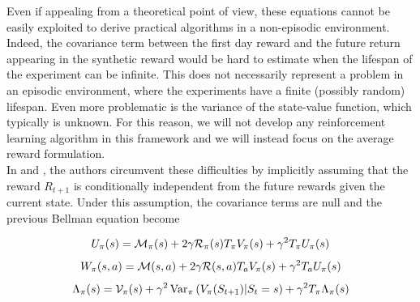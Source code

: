 Even if appealing from a theoretical point of view, these equations cannot be easily exploited to derive practical algorithms in a non-episodic environment. Indeed, the covariance term between the first day reward and the future return appearing in the synthetic reward would be hard to estimate when the lifespan of the experiment can be infinite. This does not necessarily represent a problem in an episodic environment, where the experiments have a finite (possibly random) lifespan. Even more problematic is the variance of the state-value function, which typically is unknown. For this reason, we will not develop any reinforcement learning algorithm in this framework and we will instead focus on the average reward formulation.\\
In \cite{tamar2012policy} and \cite{prashanth2014actor}, the authors circumvent these difficulties by implicitly assuming that the reward $R_{t+1}$ is conditionally independent from the future rewards given the current state. Under this assumption, the covariance terms are null and the previous Bellman equation become 
\begin{corollary}
	\begin{equation}
		U_\pi(s) = \calM_\pi(s) + 2\gamma \calR_\pi(s) T_\pi V_\pi(s) + \gamma^2 T_\pi U_\pi(s)
	\end{equation}
	\begin{equation}
		W_\pi(s,a) = \calM(s,a) + 2\gamma \calR(s,a) T_a V_\pi(s) + \gamma^2 T_a U_\pi(s)
	\end{equation}
	\begin{equation}
		\Lambda_\pi(s) = \mathcal{V}_\pi(s) + \gamma^2 \Var[\pi]{V_\pi(S_{t+1}) | S_t = s} + \gamma^2 T_\pi \Lambda_\pi(s)	
	\end{equation}
\end{corollary}

